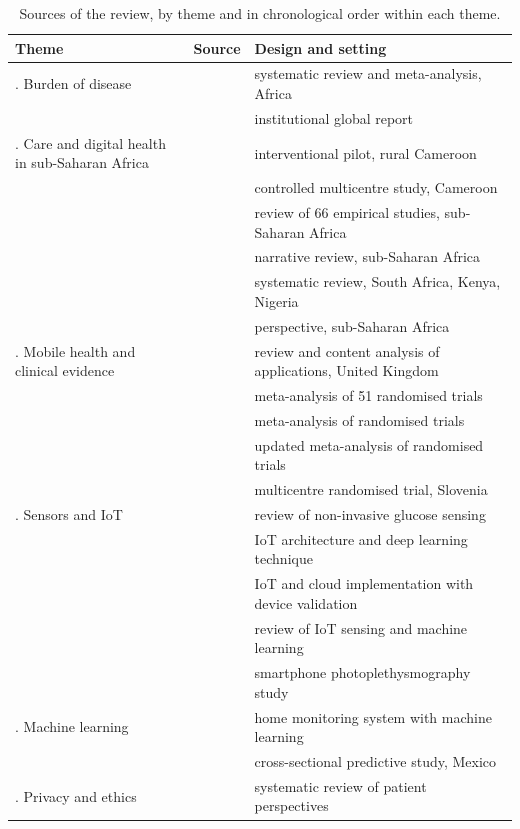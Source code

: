 \begin{table}[htbp]
\centering\footnotesize
\caption{Sources of the review, by theme and in chronological order within each theme.}\label{tab:lr-overview}
\begin{tabularx}{\textwidth}{@{}>{\raggedright\arraybackslash}p{3.4cm} >{\raggedright\arraybackslash}p{3.9cm} >{\raggedright\arraybackslash}X@{}}
\toprule
\textbf{Theme} & \textbf{Source} & \textbf{Design and setting} \\
\midrule
1. Burden of disease & \textcite{hinneh2023} & systematic review and meta-analysis, Africa \\
 & \textcite{who2023hypertension} & institutional global report \\
\addlinespace
2. Care and digital health in sub-Saharan Africa & \textcite{kingue2013} & interventional pilot, rural Cameroon \\
 & \textcite{bediang2021} & controlled multicentre study, Cameroon \\
 & \textcite{dodoo2022} & review of 66 empirical studies, sub-Saharan Africa \\
 & \textcite{gafane2024} & narrative review, sub-Saharan Africa \\
 & \textcite{agbeyangi2025} & systematic review, South Africa, Kenya, Nigeria \\
 & \textcite{segun2025} & perspective, sub-Saharan Africa \\
\addlinespace
3. Mobile health and clinical evidence & \textcite{alessa2019} & review and content analysis of applications, United Kingdom \\
 & \textcite{mao2020} & meta-analysis of 51 randomised trials \\
 & \textcite{zhou2024} & meta-analysis of randomised trials \\
 & \textcite{bandeira2024} & updated meta-analysis of randomised trials \\
 & \textcite{mihevc2025} & multicentre randomised trial, Slovenia \\
\addlinespace
4. Sensors and IoT & \textcite{alhaddad2022} & review of non-invasive glucose sensing \\
 & \textcite{tai2024} & IoT architecture and deep learning technique \\
 & \textcite{efendi2025} & IoT and cloud implementation with device validation \\
 & \textcite{liu2025review} & review of IoT sensing and machine learning \\
 & \textcite{liu2025ppg} & smartphone photoplethysmography study \\
\addlinespace
5. Machine learning & \textcite{chatrati2022} & home monitoring system with machine learning \\
 & \textcite{mendoza2025} & cross-sectional predictive study, Mexico \\
\addlinespace
6. Privacy and ethics & \textcite{alhammad2024} & systematic review of patient perspectives \\
\bottomrule
\end{tabularx}
\end{table}

